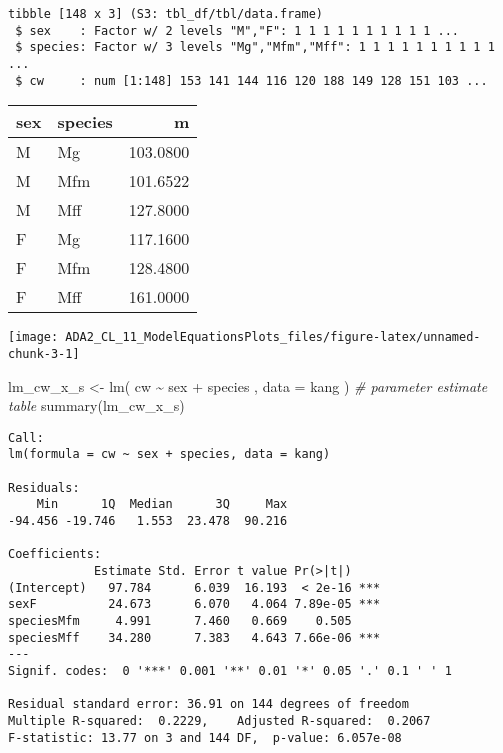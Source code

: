 \documentclass[
  12pt,
]{article}
\newenvironment{Shaded}{\begin{snugshade}}{\end{snugshade}}
\newcommand{\AttributeTok}[1]{\textcolor[rgb]{0.77,0.63,0.00}{#1}}
\newcommand{\CommentTok}[1]{\textcolor[rgb]{0.56,0.35,0.01}{\textit{#1}}}
\newcommand{\FunctionTok}[1]{\textcolor[rgb]{0.00,0.00,0.00}{#1}}
\newcommand{\NormalTok}[1]{#1}
\newcommand{\OtherTok}[1]{\textcolor[rgb]{0.56,0.35,0.01}{#1}}
\newcommand{\SpecialCharTok}[1]{\textcolor[rgb]{0.00,0.00,0.00}{#1}}
\begin{document}
\begin{verbatim}
tibble [148 x 3] (S3: tbl_df/tbl/data.frame)
 $ sex    : Factor w/ 2 levels "M","F": 1 1 1 1 1 1 1 1 1 1 ...
 $ species: Factor w/ 3 levels "Mg","Mfm","Mff": 1 1 1 1 1 1 1 1 1 1 ...
 $ cw     : num [1:148] 153 141 144 116 120 188 149 128 151 103 ...
\end{verbatim}

\begin{tabular}{l|l|r}
\hline
sex & species & m\\
\hline
M & Mg & 103.0800\\
\hline
M & Mfm & 101.6522\\
\hline
M & Mff & 127.8000\\
\hline
F & Mg & 117.1600\\
\hline
F & Mfm & 128.4800\\
\hline
F & Mff & 161.0000\\
\hline
\end{tabular}

\begin{center}\texttt{[image: ADA2\_CL\_11\_ModelEquationsPlots\_files/figure-latex/unnamed-chunk-3-1]} \end{center}

\begin{Shaded}
\begin{Highlighting}[]
\NormalTok{lm\_cw\_x\_s }\OtherTok{\textless{}{-}}
  \FunctionTok{lm}\NormalTok{(}
\NormalTok{    cw }\SpecialCharTok{\textasciitilde{}}\NormalTok{ sex }\SpecialCharTok{+}\NormalTok{ species}
\NormalTok{  , }\AttributeTok{data =}\NormalTok{ kang}
\NormalTok{  )}
\CommentTok{\# parameter estimate table}
\FunctionTok{summary}\NormalTok{(lm\_cw\_x\_s)}
\end{Highlighting}
\end{Shaded}

\begin{verbatim}
Call:
lm(formula = cw ~ sex + species, data = kang)

Residuals:
    Min      1Q  Median      3Q     Max 
-94.456 -19.746   1.553  23.478  90.216 

Coefficients:
            Estimate Std. Error t value Pr(>|t|)    
(Intercept)   97.784      6.039  16.193  < 2e-16 ***
sexF          24.673      6.070   4.064 7.89e-05 ***
speciesMfm     4.991      7.460   0.669    0.505    
speciesMff    34.280      7.383   4.643 7.66e-06 ***
---
Signif. codes:  0 '***' 0.001 '**' 0.01 '*' 0.05 '.' 0.1 ' ' 1

Residual standard error: 36.91 on 144 degrees of freedom
Multiple R-squared:  0.2229,    Adjusted R-squared:  0.2067 
F-statistic: 13.77 on 3 and 144 DF,  p-value: 6.057e-08
\end{verbatim}
\end{document}
